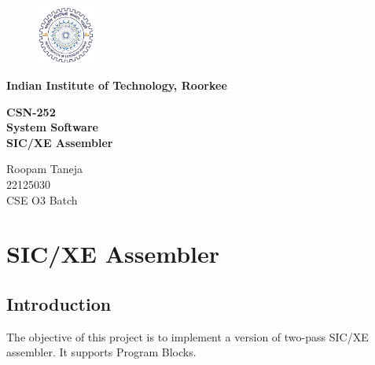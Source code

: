 \documentclass[
]{article}
\begin{document}
\begin{titlepage}
    \begin{center}
    \vspace*{1cm}
        \begin{figure}
            \centering
            \includegraphics[width=0.17\textwidth]{img/iitr_logo.png}
        \end{figure}
        
        {\LARGE\textbf{Indian Institute of Technology, Roorkee}}\\
        
        \vspace{0.4cm}
        
        {\LARGE\textbf{CSN-252}}\\
        \vspace{0.4cm}
        {\LARGE\textbf{System Software}}\\
        
        \vspace{4cm}
        {\Huge\textbf{SIC/XE Assembler}}

        \vfill
        
        \LARGE{Roopam Taneja}\\
        \LARGE{22125030}\\
        \LARGE{CSE O3 Batch}\\
        
        
        \vspace{2cm}
        
    \end{center}
\end{titlepage}

\section{SIC/XE Assembler}\label{csn-252-project}

\subsection{Introduction}\label{introduction}

The objective of this project is to implement a version of two-pass
SIC/XE assembler. It supports Program Blocks.
\end{document}
